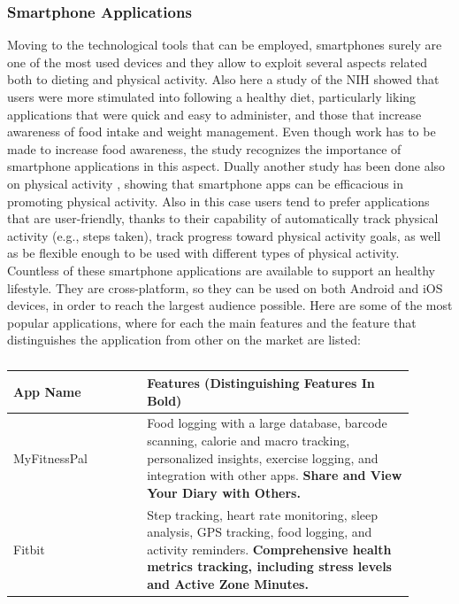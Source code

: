 \subsubsection{Smartphone Applications} %
Moving to the technological tools that can be employed, smartphones surely are one of the most used devices and they allow to exploit several aspects related both to dieting and physical activity. Also here a study of the NIH \cite{NihSmartphoneDieting} showed that users were more stimulated into following a healthy diet, particularly liking applications that were quick and easy to administer, and those that increase awareness of food intake and weight management. Even though work has to be made to increase food awareness, the study recognizes the importance of smartphone applications in this aspect. Dually another study has been done also on physical activity \cite{NihSmartphonePhysicalActivity}, showing that smartphone apps can be efficacious in promoting physical activity. Also in this case users tend to prefer applications that are user-friendly, thanks to their capability of automatically track physical activity (e.g., steps taken), track progress toward physical activity goals, as well as be flexible enough to be used with different types of physical activity. Countless of these smartphone applications are available to support an healthy lifestyle. They are cross-platform, so they can be used on both Android and iOS devices, in order to reach the largest audience possible. Here are some of the most popular applications, where for each the main features and the feature that distinguishes the application from other on the market are listed:
\begin{table}[h!]
    \captionsetup{labelformat=empty}
    \setstretch{\myspacing}
    \centering
    \begin{tabular}{|>{\raggedright\arraybackslash}p{0.3\linewidth}|>{\raggedright\arraybackslash}p{0.6\linewidth}|}
        \hline
        \textbf{App Name} & \textbf{Features (Distinguishing Features In Bold)}                                                                                                                                                                                              \\
        \hline
        MyFitnessPal      & Food logging with a large database, barcode scanning, calorie and macro tracking, personalized insights, exercise logging, and integration with other apps. \textbf{Share and View Your Diary with Others.} \\
        \hline
        Fitbit            & Step tracking, heart rate monitoring, sleep analysis, GPS tracking, food logging, and activity reminders. \textbf{Comprehensive health metrics tracking, including stress levels and Active Zone Minutes.}                                       \\
        \hline
    \end{tabular}
    \caption{}
    \label{popularApps}
\end{table}

